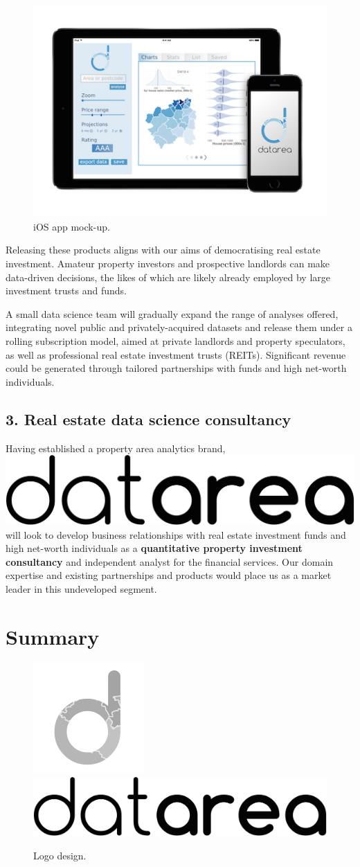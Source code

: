 \documentclass[
10pt, %
a4paper, %
oneside, %
headinclude,footinclude, %
BCOR5mm, %
]{scrartcl}
\newcommand*{\logo}{\includegraphics[scale=.04]{Figures/logotext.png}}
\begin{document}
\begin{figure}
\centering
\includegraphics[width=.39\textwidth]{Figures/mockup.png}
\caption{ iOS app mock-up.}
\end{figure}

Releasing these products aligns with our aims of democratising real
estate investment. Amateur property investors and prospective
landlords can make data-driven decisions, the likes of which are likely
already employed by large investment trusts and funds. 

A small data science team will gradually expand the range of analyses
offered, integrating novel public and privately-acquired datasets and
release them under a rolling subscription model, aimed at private
landlords and property speculators, as well as professional real
estate investment trusts (REITs). Significant revenue could be
generated through tailored partnerships with funds and high net-worth
individuals.

\subsection*{3. Real estate data science consultancy}

Having established a property area analytics brand, \logo\hspace{.1em}
will look to develop business relationships with real estate
investment funds and high net-worth individuals as a {\bf quantitative
  property investment consultancy} and independent analyst for the
financial services. Our domain expertise and existing partnerships and
products would place us as a market leader in this undeveloped
segment.

\section*{Summary}

\begin{figure}
\vspace{2em}
\centering
\includegraphics[width=.2\textwidth]{Figures/logo.png}
\includegraphics[width=.2\textwidth]{Figures/logotext.png}
\caption{ Logo design. }
\end{figure}
\end{document}
